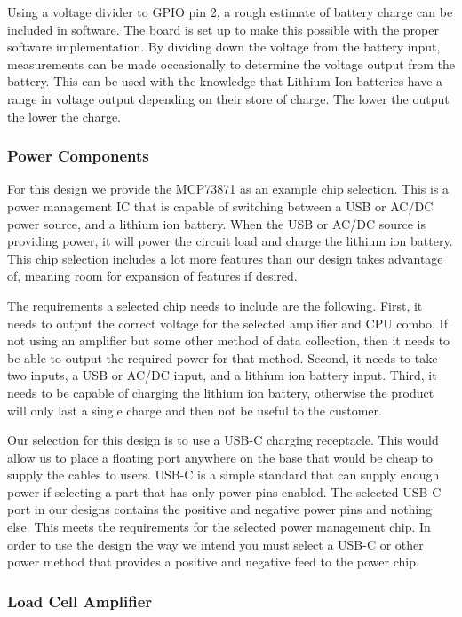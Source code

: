 Using a voltage divider to GPIO pin 2, a rough estimate of battery charge can be included in software. The board is set up to make this possible with the proper software implementation. By dividing down the voltage from the battery input, measurements can be made occasionally to determine the voltage output from the battery. This can be used with the knowledge that Lithium Ion batteries have a range in voltage output depending on their store of charge. The lower the output the lower the charge. 

\subsubsection{Power Components}

For this design we provide the MCP73871 as an example chip selection. This is a power management IC that is capable of switching between a USB or AC/DC power source, and a lithium ion battery. When the USB or AC/DC source is providing power, it will power the circuit load and charge the lithium ion battery. This chip selection includes a lot more features than our design takes advantage of, meaning room for expansion of features if desired. 

The requirements a selected chip needs to include are the following. First, it needs to output the correct voltage for the selected amplifier and CPU combo. If not using an amplifier but some other method of data collection, then it needs to be able to output the required power for that method. Second, it needs to take two inputs, a USB or AC/DC input, and a lithium ion battery input. Third, it needs to be capable of charging the lithium ion battery, otherwise the product will only last a single charge and then not be useful to the customer. 

Our selection for this design is to use a USB-C charging receptacle. This would allow us to place a floating port anywhere on the base that would be cheap to supply the cables to users. USB-C is a simple standard that can supply enough power if selecting a part that has only power pins enabled. The selected USB-C port in our designs contains the positive and negative power pins and nothing else. This meets the requirements for the selected power management chip. In order to use the design the way we intend you must select a USB-C or other power method that provides a positive and negative feed to the power chip. 

\subsubsection{Load Cell Amplifier}

